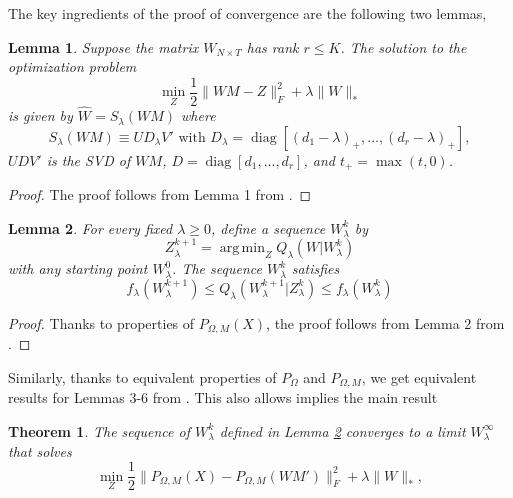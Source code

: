 \documentclass[preprint]{imsart}
\numberwithin{equation}{section}
\theoremstyle{plain}
\newtheorem{theorem}{Theorem}
\newtheorem{lemma}{Lemma}
\DeclareMathOperator*{\argmin}{arg\,min}
\DeclareMathOperator*{\diag}{diag}
\begin{document}
The key ingredients of the proof of convergence are the following two lemmas,
\begin{lemma}
Suppose the matrix $W_{N \times T}$ has rank $r \leq K$. The solution to the optimization problem
\begin{equation}\label{eq:lemma1}
\min_Z \frac{1}{2}\|WM - Z \|_F^2 + \lambda\|W\|_*
\end{equation}
is given by $\hat{W} = S_\lambda(WM)$ where
\[
S_\lambda(WM) \equiv UD_\lambda V' \text{ with } D_\lambda = \diag[(d_1 - \lambda)_+, ..., (d_r - \lambda)_+],
\]
$UDV'$ is the SVD of $WM$, $D = \diag[d_1,...,d_r]$, and $t_+ = \max(t,0)$.
\end{lemma}
\begin{proof}
The proof follows from Lemma 1 from \citep{mazumder2010spectral}. %
\end{proof}
\begin{lemma}\label{eq:z-sequence}
For every fixed $\lambda \geq 0$, define a sequence $W_\lambda^k$ by
\[
Z_\lambda^{k+1} = \argmin_Z Q_\lambda(W|W_\lambda^k)
\]
with any starting point $W_\lambda^0$. The sequence $W_\lambda^k$ satisfies 
\[
f_\lambda(W_\lambda^{k+1}) \leq  Q_\lambda(W_\lambda^{k+1} | Z_\lambda^k ) \leq f_\lambda(W_\lambda^{k})
\]
\end{lemma}
\begin{proof}
Thanks to properties of $P_{\Omega,M}(X)$, the proof follows from Lemma 2 from \citep{mazumder2010spectral}.
\end{proof}
Similarly, thanks to equivalent properties of $P_\Omega$ and $P_{\Omega,M}$, we get equivalent results for Lemmas 3-6 from \citep{mazumder2010spectral}. This also allows implies the main result
\begin{theorem}
The sequence of $W_{\lambda}^k$ defined in Lemma \ref{eq:z-sequence} converges to a limit $W_\lambda^\infty$ that solves
\[
\min_Z \frac{1}{2} \|P_{\Omega,M}(X) - P_{\Omega,M}(WM')\|_F^2 + \lambda\|W\|_*,
\]
\end{theorem}
\end{document}
